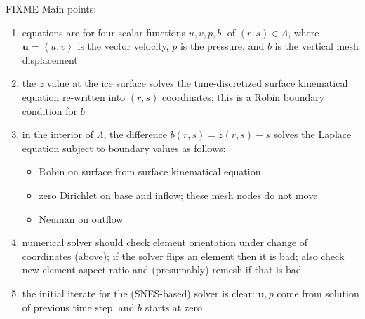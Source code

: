 \documentclass[letterpaper,final,12pt,reqno]{amsart}
\newcommand{\bu}{\mathbf{u}}
\begin{document}
FIXME Main points:
\renewcommand{\labelenumi}{\arabic{enumi}.}
\begin{enumerate}
\item equations are for four scalar functions $u,v,p,b$, of $(r,s) \in \Lambda$, where $\bu=\left<u,v\right>$ is the vector velocity, $p$ is the pressure, and $b$ is the vertical mesh displacement
\item the $z$ value at the ice surface solves the time-discretized surface kinematical equation re-written into $(r,s)$ coordinates; this is a Robin boundary condition for $b$
\item in the interior of $\Lambda$, the difference $b(r,s)=z(r,s)-s$ solves the Laplace equation subject to boundary values as follows:
    \begin{itemize}
    \item Robin on surface from surface kinematical equation
    \item zero Dirichlet on base and inflow; these mesh nodes do not move
    \item Neuman on outflow
    \end{itemize}
\item numerical solver should check element orientation under change of coordinates (above); if the solver flips an element then it is bad; also check new element aspect ratio and (presumably) remesh if that is bad
\item the initial iterate for the (SNES-based) solver is clear: $\bu,p$ come from solution of previous time step, and $b$ starts at zero
\end{enumerate}



\small

\bigskip


\end{document}
